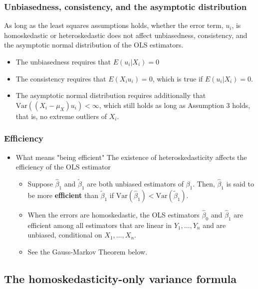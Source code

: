 \documentclass[a4paper,11pt]{article}
\newcommand{\var}{\mathrm{Var}}
\begin{document}
\subsubsection*{Unbiasedness, consistency, and the asymptotic distribution}
\label{sec:org9691749}
As long as the least squares assumptions holds, whether the error
term, \(u_i\), is homoskedastic or heteroskedastic does not affect
unbiasedness, consistency, and the asymptotic normal distribution
of the OLS estimators.
\begin{itemize}
\item The unbiasedness requires that \(E(u_i|X_i) = 0\)
\item The consistency requires that \(E(X_i u_i) = 0\), which is true if
\(E(u_i|X_i)=0\).
\item The asymptotic normal distribution requires additionally that
\(\var((X_i-\mu_X)u_i) < \infty\), which still holds as long as
Assumption 3 holds, that is, no extreme outliers of \(X_i\).
\end{itemize}
\subsubsection*{Efficiency}
\label{sec:org6afd926}
\begin{itemize}
\item What means "being efficient"
\label{sec:orgca89143}
The existence of heteroskedasticity affects the efficiency of the
OLS estimator
\begin{itemize}
\item Suppose \(\hat{\beta}_1\) and \(\tilde{\beta}_1\) are both unbiased
estimators of \(\beta_1\). Then, \(\hat{\beta}_1\) is said to be more
\textbf{efficient} than \(\tilde{\beta}_1\) if \(\var(\hat{\beta}_1) <
  \var(\tilde{\beta}_1)\).
\item When the errors are homoskedastic, the OLS estimators
\(\hat{\beta}_0\) and \(\hat{\beta}_1\) are efficient among all
estimators that are linear in \(Y_1, \ldots, Y_n\) and are unbiased,
conditional on \(X_1, \ldots, X_n\).

\item See the Gauss-Markov Theorem below.
\end{itemize}
\end{itemize}

\subsection{The homoskedasticity-only variance formula}
\label{sec:org9d21e4a}
\end{document}
